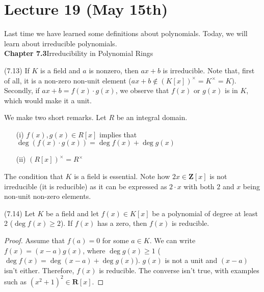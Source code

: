 \section{Lecture 19 (May 15th)}
Last time we have learned some definitions about polynomials. Today, we will learn about irreducible polynomials.\\
\newline
{\bf Chapter 7.3}\hspace{2ex}Irreducibility in Polynomial Rings 
\newline
\begin{ex}
(7.13) If $K$ is a field and $a$ is nonzero, then $ax+b$ is irreducible. Note that, first of all, it is a non-zero non-unit element ($ax+b\notin (K[x])^{\times }=K^{\times }=K$). Secondly, if $ax+b=f(x)\cdot g(x)$, we observe that $f(x)$ or $g(x)$ is in $K$, which would make it a unit. 
\end{ex}
\vspace{2ex}
\begin{rmk}
We make two short remarks. Let $R$ be an integral domain. 
\begin{itemize}
\item[(i)] $f(x),g(x)\in R[x]$ implies that $\mathop{\mathrm{deg}}(f(x)\cdot g(x))=\mathop{\mathrm{deg}}f(x)+\mathop{\mathrm{deg}}g(x)$
\item[(ii)] $(R[x])^{\times }=R^{\times }$
\end{itemize}
\end{rmk}
\vspace{2ex}
\begin{rmk}
The condition that $K$ is a field is essential. Note how $2x\in {\bm Z}[x]$ is not irreducible (it is reducible) as it can be expressed as $2\cdot x$ with both $2$ and $x$ being non-unit non-zero elements.
\end{rmk}
\vspace{2ex}
\begin{prop}
(7.14) Let $K$ be a field and let $f(x)\in K[x]$ be a polynomial of degree at least 2 ($\mathop{\mathrm{deg}}f(x)\geq 2$). If $f(x)$ has a zero, then $f(x)$ is reducible. 
\end{prop}
\vspace{2ex}
\begin{proof}
Assume that $f(a)=0$ for some $a\in K$. We can write $f(x)=(x-a)g(x)$, where $\mathop{\mathrm{deg}}g(x)\geq 1$ ($\mathop{\mathrm{deg}}f(x)=\mathop{\mathrm{deg}}(x-a)+\mathop{\mathrm{deg}}g(x)$). $g(x)$ is not a unit and $(x-a)$ isn't either. Therefore, $f(x)$ is reducible. The converse isn't true, with examples such as $(x^2+1)^2\in {\bm R}[x]$.
\end{proof}
